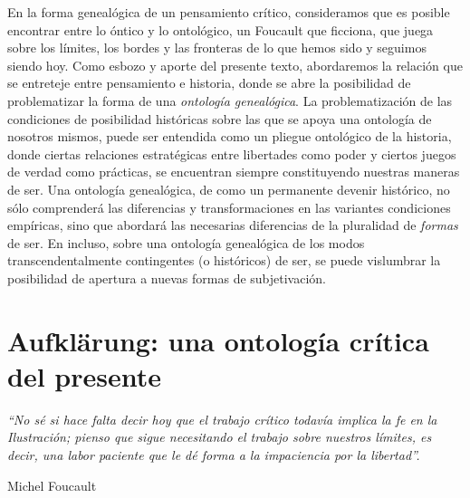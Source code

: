 En la forma genealógica de un pensamiento crítico, consideramos que es posible encontrar entre lo óntico y lo ontológico, un Foucault que ficciona, que juega sobre los límites, los bordes y las fronteras de lo que hemos sido y seguimos siendo hoy. Como esbozo y aporte del presente texto, abordaremos la relación que se entreteje entre pensamiento e historia, donde se abre la posibilidad de problematizar la forma de una \emph{ontología genealógica}. La problematización de las condiciones de posibilidad históricas sobre las que se apoya una ontología de nosotros mismos, puede ser entendida como un pliegue ontológico de la historia, donde ciertas relaciones estratégicas entre libertades como poder y ciertos juegos de verdad como prácticas, se encuentran siempre constituyendo nuestras maneras de ser. Una ontología genealógica, de como un permanente devenir histórico, no sólo comprenderá las diferencias y transformaciones en las variantes condiciones empíricas, sino que abordará las necesarias diferencias de la pluralidad de \emph{formas} de ser. En incluso, sobre una ontología genealógica de los modos transcendentalmente contingentes (o históricos) de ser, se puede vislumbrar la posibilidad de apertura a nuevas formas de subjetivación.

\section{Aufklärung: una ontología crítica del presente}

\epigraph{\emph{\enquote{No sé si hace falta decir hoy que el trabajo crítico todavía implica la fe en la Ilustración; pienso que sigue necesitando el trabajo sobre nuestros límites, es decir, una labor paciente que le dé forma a la impaciencia por la libertad}.}}{Michel Foucault}


